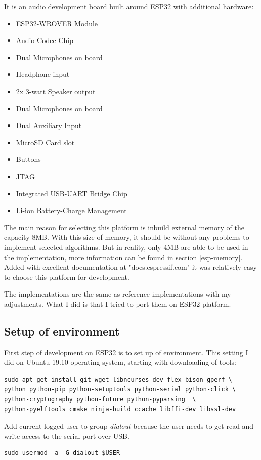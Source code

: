 \documentclass[thesis=M,english]{FITthesis}[2019/12/23]
\begin{document}
It is an audio development board built around ESP32 with additional hardware:
\begin{itemize}
\item	ESP32-WROVER Module
\item	Audio Codec Chip
\item	Dual Microphones on board
\item	Headphone input
\item	2x 3-watt Speaker output
\item	Dual Microphones on board
\item	Dual Auxiliary Input
\item	MicroSD Card slot
\item	Buttons
\item	JTAG
\item	Integrated USB-UART Bridge Chip
\item	Li-ion Battery-Charge Management
\end{itemize}

The main reason for selecting this platform is inbuild external memory of the capacity 8MB. With this size of memory, it should be without any problems to implement selected algorithms. But in reality, only 4MB are able to be used in the implementation, more information can be found in section \ref{esp-memory}. Added with excellent documentation at "docs.espressif.com" it was relatively easy to choose this platform for development.

\bigskip
\noindent
The implementations are the same as reference implementations with my adjustments. What I did is that I tried to port them on ESP32 platform.

\subsection{Setup of environment}
First step of development on ESP32 is to set up of environment. This setting I did on Ubuntu 19.10 operating system, starting with downloading of tools:
\begin{lstlisting}[frame=single]
sudo apt-get install git wget libncurses-dev flex bison gperf \
python python-pip python-setuptools python-serial python-click \
python-cryptography python-future python-pyparsing  \
python-pyelftools cmake ninja-build ccache libffi-dev libssl-dev
\end{lstlisting}

\bigskip
\noindent
Add current logged user to group \textit{dialout} because the user needs to get read and write access to the serial port over USB.
\begin{lstlisting}[frame=single]
sudo usermod -a -G dialout $USER
\end{lstlisting}
\end{document}
